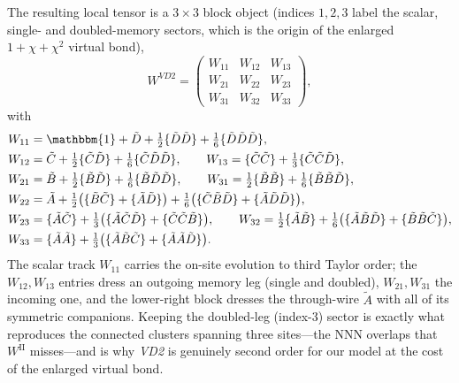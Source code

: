 The resulting local tensor is a $3\times3$ block object (indices $1,2,3$ label the scalar, single- and doubled-memory sectors, which is the origin of the enlarged $1+\chi+\chi^2$ virtual bond),
\begin{equation}
  W^{\textit{VD2}} =
  \begin{pmatrix}
    W_{11} & W_{12} & W_{13} \\
    W_{21} & W_{22} & W_{23} \\
    W_{31} & W_{32} & W_{33}
  \end{pmatrix},
\end{equation}
with
\begin{align}
  W_{11} &= \mathbbm{1} + \tilde D + \tfrac12\{\tilde D\tilde D\} + \tfrac16\{\tilde D\tilde D\tilde D\}, \\
  W_{12} &= \tilde C + \tfrac12\{\tilde C\tilde D\} + \tfrac16\{\tilde C\tilde D\tilde D\}, \qquad
  W_{13} = \{\tilde C\tilde C\} + \tfrac13\{\tilde C\tilde C\tilde D\}, \\
  W_{21} &= \tilde B + \tfrac12\{\tilde B\tilde D\} + \tfrac16\{\tilde B\tilde D\tilde D\}, \qquad
  W_{31} = \tfrac12\{\tilde B\tilde B\} + \tfrac16\{\tilde B\tilde B\tilde D\}, \\
  W_{22} &= \tilde A + \tfrac12\big(\{\tilde B\tilde C\}+\{\tilde A\tilde D\}\big)
            + \tfrac16\big(\{\tilde C\tilde B\tilde D\}+\{\tilde A\tilde D\tilde D\}\big), \\
  W_{23} &= \{\tilde A\tilde C\} + \tfrac13\big(\{\tilde A\tilde C\tilde D\}+\{\tilde C\tilde C\tilde B\}\big), \qquad
  W_{32} = \tfrac12\{\tilde A\tilde B\} + \tfrac16\big(\{\tilde A\tilde B\tilde D\}+\{\tilde B\tilde B\tilde C\}\big), \\
  W_{33} &= \{\tilde A\tilde A\} + \tfrac13\big(\{\tilde A\tilde B\tilde C\}+\{\tilde A\tilde A\tilde D\}\big).
\end{align}
The scalar track $W_{11}$ carries the on-site evolution to third Taylor order; the $W_{12},W_{13}$ entries dress an outgoing memory leg (single and doubled), $W_{21},W_{31}$ the incoming one, and the lower-right block dresses the through-wire $\tilde A$ with all of its symmetric companions. Keeping the doubled-leg (index-3) sector is exactly what reproduces the connected clusters spanning three sites---the \ac{NNN} overlaps that $W^{\mathrm{II}}$ misses---and is why \textit{VD2} is genuinely second order for our model at the cost of the enlarged virtual bond.


